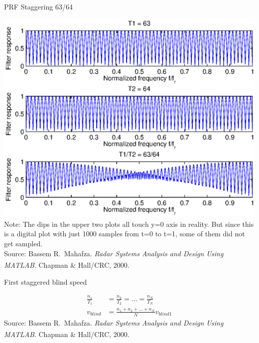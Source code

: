 \documentclass[mathserif]{beamer}
\begin{document}
   
    \begin{frame}{PRF Staggering 63/64}
      \begin{minipage}[t][0.8\textheight][t]{\textwidth}
	\centering
	\includegraphics[width=0.7\linewidth]{prfStaggering63_64} \\
	\vfill
	\tiny{Note: The dips in the upper two plots all touch y=0 axis in reality. But since this is a digital plot with just 1000 samples from t=0 to t=1, some of them did not get sampled.} \\
	\tiny{Source: Bassem R.~Mahafza. \emph{Radar Systems Analysis and Design Using MATLAB\textsuperscript{\textregistered}}. Chapman \& Hall/CRC, 2000.}
      \end{minipage}
    \end{frame}
    
    \begin{frame}{First staggered blind speed}
      \begin{minipage}[t][0.8\textheight][t]{\textwidth}
	\begin{align}
	  \frac{n_1}{T_1} & = \frac{n_2}{T_2} = ... = \frac{n_N}{T_N} \nonumber \\
	  v_{blind} & = \frac{n_1 + n_2 + ... + n_N}{N} v_{blind1} \nonumber
	\end{align}
	\vfill
	\tiny{Source: Bassem R.~Mahafza. \emph{Radar Systems Analysis and Design Using MATLAB\textsuperscript{\textregistered}}. Chapman \& Hall/CRC, 2000.}
      \end{minipage}
    \end{frame}

    
    
\end{document}
